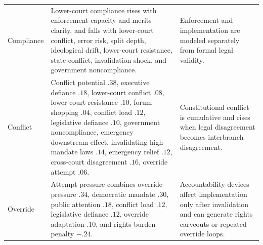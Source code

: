 \begin{table}[p]
\begin{tabular}{>{\raggedright\arraybackslash}p{1.10in}>{\raggedright\arraybackslash}p{2.65in}>{\raggedright\arraybackslash}p{2.05in}}
Compliance & Lower-court compliance rises with enforcement capacity and merits clarity, and falls with lower-court conflict, error risk, split depth, ideological drift, lower-court resistance, state conflict, invalidation shock, and government noncompliance. & Enforcement and implementation are modeled separately from formal legal validity. \\
Conflict & Conflict potential $.38$, executive defiance $.18$, lower-court conflict $.08$, lower-court resistance $.10$, forum shopping $.04$, conflict load $.12$, legislative defiance $.10$, government noncompliance, emergency downstream effect, invalidating high-mandate laws $.14$, emergency relief $.12$, cross-court disagreement $.16$, override attempt $.06$. & Constitutional conflict is cumulative and rises when legal disagreement becomes interbranch disagreement. \\
Override & Attempt pressure combines override pressure $.34$, democratic mandate $.30$, public attention $.18$, conflict load $.12$, legislative defiance $.12$, override adaptation $.10$, and rights-burden penalty $-.24$. & Accountability devices affect implementation only after invalidation and can generate rights carveouts or repeated override loops. \\
\bottomrule
\end{tabular}
\end{table}
